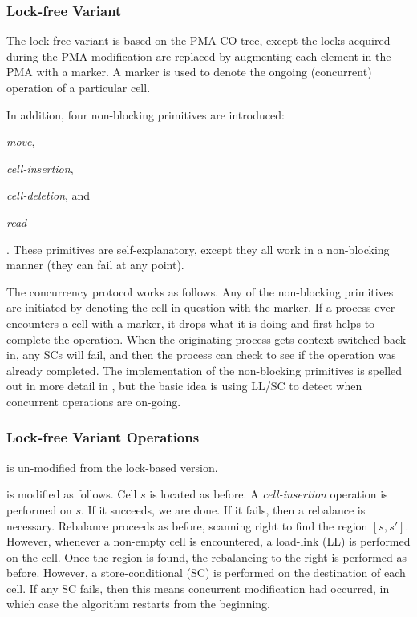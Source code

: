 \documentclass{style}
\begin{document}
\subsubsection{Lock-free Variant}
The lock-free variant is based on the PMA CO tree, except the locks acquired
during the PMA modification are replaced by augmenting each element in the PMA
with a marker. A marker is used to denote the ongoing (concurrent) operation
of a particular cell.

In addition, four non-blocking primitives are introduced:
\begin{inparaenum}[(a)]
  \item \textit{move},
  \item \textit{cell-insertion},
  \item \textit{cell-deletion}, and
  \item \textit{read}
\end{inparaenum}. These primitives are self-explanatory, except they
all work in a non-blocking manner (they can fail at any point).

The concurrency protocol works as follows. Any of the non-blocking primitives
are initiated by denoting the cell in question with the marker. If a process
ever encounters a cell with a marker, it drops what it is doing and first helps
to complete the operation. When the originating process gets context-switched
back in, any SCs will fail, and then the process can check to see if the
operation was already completed. The implementation of the non-blocking
primitives is spelled out in more detail in \cite{BenderFiGi05}, but the basic
idea is using LL/SC to detect when concurrent operations are on-going.

\subsubsection{Lock-free Variant Operations}

\Search{} is un-modified from the lock-based version.

\Insert{} is modified as follows. Cell $s$ is located as before. A
\textit{cell-insertion} operation is performed on $s$. If it succeeds, we are
done. If it fails, then a rebalance is necessary. Rebalance proceeds as before,
scanning right to find the region $[s, s']$. However, whenever a non-empty cell
is encountered, a load-link (LL) is performed on the cell.  Once the region is
found, the rebalancing-to-the-right is performed as before.  However, a
store-conditional (SC) is performed on the destination of each cell.  If any SC
fails, then this means concurrent modification had occurred, in which case the
algorithm restarts from the beginning.
\end{document}
